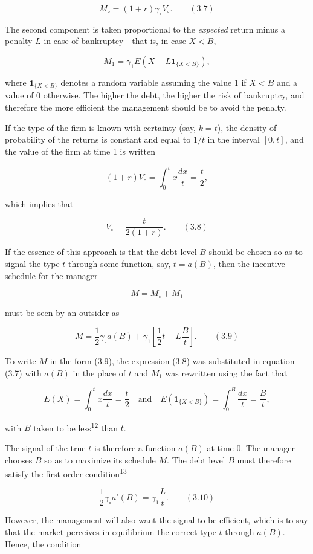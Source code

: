 \documentclass[11pt,a4paper]{article}
\begin{document}
\[M_\circ = (1 + r)\gamma_\circ V_\circ. \qquad (3.7)\]

The second component is taken proportional to the \emph{expected} return minus a penalty \(L\) in
case of bankruptcy---that is, in case \(X < B\),

\[M_1 = \gamma_1 E(X - L\mathbf{1}_{\{X < B\}}),\]

where \(\mathbf{1}_{\{X < B\}}\) denotes a random variable assuming the value 1 if \(X < B\) and a
value of 0 otherwise. The higher the debt, the higher the risk of bankruptcy, and therefore the more
efficient the management should be to avoid the penalty.

If the type of the firm is known with certainty (say, \(k = t\)), the density of probability of the
returns is constant and equal to \(1/t\) in the interval \([0, t]\), and the value of the firm at
time 1 is written

\[(1 + r)V_\circ = \int_0^t x\frac{dx}{t} = \frac{t}{2},\]

which implies that

\[V_\circ = \frac{t}{2(1 + r)}. \qquad (3.8)\]

If the essence of this approach is that the debt level \(B\) should be chosen so as to signal the
type \(t\) through some function, say, \(t = a(B)\), then the incentive schedule for the manager

\[M = M_\circ + M_1\]

must be seen by an outsider as

\[M = \frac{1}{2}\gamma_\circ a(B) + \gamma_1\left[\frac{1}{2}t - L\frac{B}{t}\right]. \qquad (3.9)\]

To write \(M\) in the form (3.9), the expression (3.8) was substituted in equation (3.7) with
\(a(B)\) in the place of \(t\) and \(M_1\) was rewritten using the fact that

\[E(X) = \int_0^t x\frac{dx}{t} = \frac{t}{2} \quad \text{and} \quad E(\mathbf{1}_{\{X < B\}}) = \int_0^B \frac{dx}{t} = \frac{B}{t},\]

with \(B\) taken to be less\textsuperscript{12} than \(t\).

The signal of the true \(t\) is therefore a function \(a(B)\) at time 0. The manager chooses \(B\)
so as to maximize its schedule \(M\). The debt level \(B\) must therefore satisfy the first-order
condition\textsuperscript{13}

\[\frac{1}{2}\gamma_\circ a'(B) = \gamma_1\frac{L}{t}. \qquad (3.10)\]

However, the management will also want the signal to be efficient, which is to say that the market
perceives in equilibrium the correct type \(t\) through \(a(B)\). Hence, the condition
\end{document}
